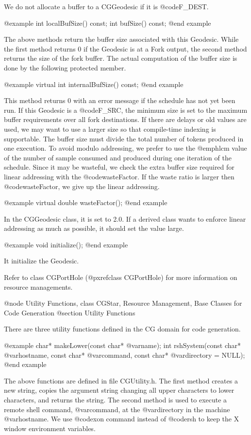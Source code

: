 We do not allocate a buffer to a CGGeodesic if it is @code{F_DEST}.

@example
int localBufSize() const;
int bufSize() const;
@end example

The above methods return the buffer size associated with this Geodesic.
While the first method returns 0 if the Geodesic is at a Fork output, the
second method returns the size of the fork buffer. The actual computation of
the buffer size is done by the following protected member.

@example
virtual int internalBufSize() const;
@end example

This method returns 0 with an error message if the schedule has not
yet been run. If this Geodesic is a @code{F_SRC}, the minimum size
is set to the maximum buffer requirements over all fork destinations.
If there are delays or old values are used, we may want to use a
larger size so that compile-time indexing is supportable. The buffer size
must divide the total number of tokens produced in one execution.
To avoid modulo addressing, we prefer to use the @emph{lcm} value of
the number of sample consumed and produced during one iteration of the
schedule. Since it may be wasteful, we check the extra buffer size required
for linear addressing with the @code{wasteFactor}. If the waste ratio is
larger then @code{wasteFactor}, we give up the linear addressing.

@example
virtual double wasteFactor();
@end example

In the CGGeodesic class, it is set to 2.0. If a derived class wants to
enforce linear addressing as much as possible, it should set the value
large.

@example
void initialize();
@end example

It initialize the Geodesic.

Refer to class CGPortHole (@pxref{class CGPortHole}) for more information
on resource managements.

@node Utility Functions, class CGStar, Resource Management, Base Classes for Code Generation
@section Utility Functions

There are three utility functions defined in the CG domain for code generation.

@example
char* makeLower(const char* @var{name});
int rshSystem(const char* @var{hostname}, const char* @var{command}, const char* @var{directory} = NULL);
@end example

The above functions are defined in file CGUtility.h.
The first method creates a new string, copies the argument
string changing all upper characters to lower characters, and returns the
string. The second method is used to execute a remote shell command,
@var{command}, at the @var{directory} in the machine @var{hostname}. We use
@code{xon} command instead of @code{rsh} to keep the X window environment
variables.

